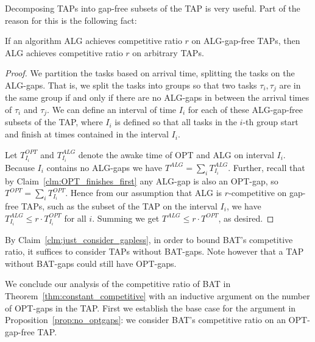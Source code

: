 Decomposing TAPs into gap-free subsets of the TAP is very useful.
Part of the reason for this is the following fact:
\begin{claim}
  \label{clm:just_consider_gapless}
  If an algorithm ALG achieves competitive ratio $r$ on
  ALG-gap-free TAPs, then ALG achieves 
  competitive ratio $r$ on arbitrary TAPs.
\end{claim}
\begin{proof}
  We partition the tasks based on arrival time, splitting the
  tasks on the ALG-gaps. That is, we split the tasks into groups
  so that two tasks $\tau_i, \tau_j$ are in the same group if and
  only if there are no ALG-gaps in between the arrival times of
  $\tau_i$ and $\tau_j$.
  We can define an interval of time $I_i$ for each of these
  ALG-gap-free subsets of the TAP, where $I_i$ is defined so that
  all tasks in the $i$-th group start and finish at times
  contained in the interval $I_i$.

  Let $T_{I_i}^{OPT}$ and $T_{I_i}^{ALG}$ denote the awake time
  of OPT and ALG on interval $I_i$. Because $I_i$ contains no
  ALG-gaps we have $T^{ALG} = \sum_{i} T^{ALG}_{I_i}$.
  Further, recall that by Claim~\ref{clm:OPT_finishes_first} any
  ALG-gap is also an OPT-gap, so
  $T^{OPT} = \sum_{i} T_{I_i}^{OPT}$. 
  Hence from our assumption that ALG is $r$-competitive on
  gap-free TAPs, such as the subset of the TAP on the interval
  $I_i$, we have $T_{I_i}^{ALG} \le r\cdot T_{I_i}^{OPT}$ for
  all $i$. Summing we get $T^{ALG} \le r\cdot T^{OPT}$, as desired.
  
\end{proof}

By Claim~\ref{clm:just_consider_gapless}, in order to bound BAT's
competitive ratio, it suffices to consider TAPs
without BAT-gaps. Note however that a TAP without
BAT-gaps could still have OPT-gaps.

We conclude our analysis of the competitive ratio of BAT in
Theorem~\ref{thm:constant_competitive} with an inductive argument on
the number of OPT-gaps in the TAP.
First we establish the base case for the argument in
Proposition~\ref{prop:no_optgaps}: we consider
BAT's competitive ratio on an OPT-gap-free TAP.  

